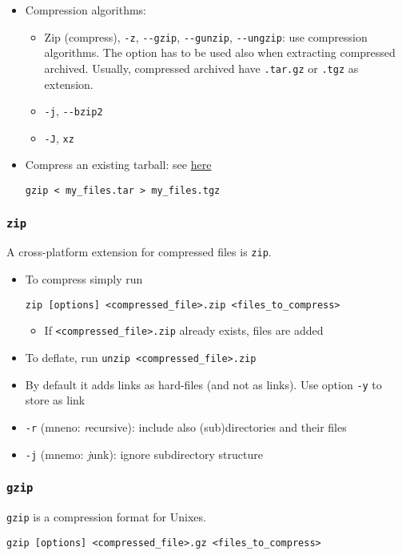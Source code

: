 \documentclass[a4paper,12pt,%
              final%
              ]{article}
\begin{document}
\begin{itemize}
\begin{itemize}
    \end{itemize}
  \item Compression algorithms:
    \begin{itemize}
      \item Zip (compress), \verb|-z|, \verb|--gzip|, \verb|--gunzip|, \verb|--ungzip|: use compression algorithms. The option has to be used also when extracting compressed archived. Usually, compressed archived have \verb|.tar.gz| or \verb|.tgz| as extension.
      \item \verb|-j|, \verb|--bzip2|
      \item \verb|-J|, \verb|xz|
    \end{itemize}
  \item Compress an existing tarball: see \href{https://unix.stackexchange.com/questions/457949/how-to-turn-a-tar-file-to-a-tgz-file}{here}
\begin{verbatim}
gzip < my_files.tar > my_files.tgz
\end{verbatim}
\end{itemize}

\subsubsection{\texttt{zip}}
A cross-platform extension for compressed files is \texttt{zip}.
\begin{itemize}
  \item To compress simply run
\begin{verbatim}
zip [options] <compressed_file>.zip <files_to_compress>
\end{verbatim}
    \begin{itemize}
      \item If \verb|<compressed_file>.zip| already exists, files are added
    \end{itemize}
  \item To deflate, run \verb|unzip <compressed_file>.zip|
  \item By default it adds links as hard-files (and not as links). Use option \verb|-y| to store as link
  \item \verb|-r| (mneno: \emph{r}ecursive): include also (sub)directories and their files
  \item \verb|-j| (mnemo: \emph{j}unk): ignore subdirectory structure
\end{itemize}

\subsubsection{\texttt{gzip}}
\texttt{gzip} is a compression format for Unixes.
\begin{verbatim}
gzip [options] <compressed_file>.gz <files_to_compress>
\end{verbatim}
\end{document}
